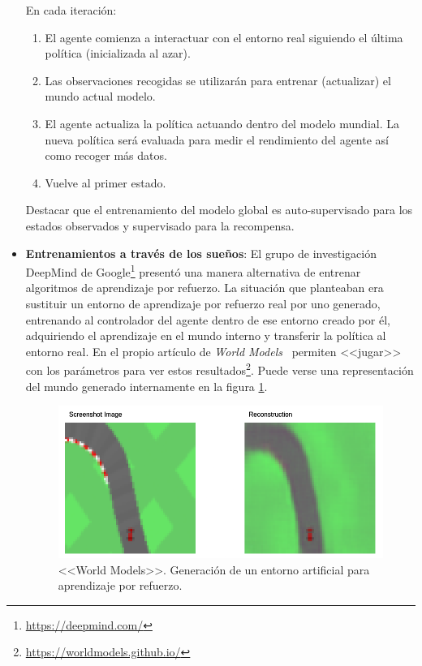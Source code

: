 \begin{itemize}
    En cada iteración:\\
    \begin{enumerate}
        \item El agente comienza a interactuar con el entorno real siguiendo el última política (inicializada al azar).\\
        \item Las observaciones recogidas se utilizarán para entrenar (actualizar) el mundo actual modelo.\\
        \item El agente actualiza la política actuando dentro del modelo mundial. La nueva política será evaluada para medir el rendimiento del agente así como recoger más datos.\\
        \item Vuelve al primer estado.\\
    \end{enumerate}
    
      Destacar que el entrenamiento del modelo global es auto-supervisado para los estados observados y supervisado para la recompensa.\\
    
    \item \textbf{Entrenamientos a través de los sueños}: El grupo de investigación DeepMind de Google\footnote{\url{https://deepmind.com/}} presentó una manera alternativa de entrenar algoritmos de aprendizaje por refuerzo. La situación que planteaban era sustituir un entorno de aprendizaje por refuerzo real por uno generado, entrenando al controlador del agente dentro de ese entorno creado por él, adquiriendo el aprendizaje en el mundo interno y transferir la política al entorno real. En el propio artículo de \textit{World Models}~\cite{world_models} permiten <<jugar>> con los parámetros para ver estos resultados\footnote{\url{https://worldmodels.github.io/}}. Puede verse una representación del mundo generado internamente en la figura \ref{fig:world_models}.\\
    
    \begin{figure}[!ht]
        \centering \includegraphics[width=0.6\columnwidth]{./figures/chapter_2/world_models.png}
        \caption{<<World Models>>. Generación de un entorno artificial para aprendizaje por refuerzo.}\label{fig:world_models}
    \end{figure}
    

\end{itemize}
